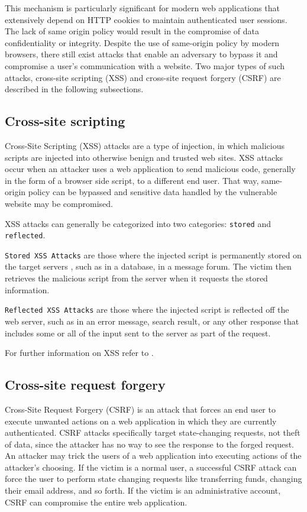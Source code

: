 This mechanism is particularly significant for modern web applications that extensively 
depend on HTTP cookies to maintain authenticated user sessions. The lack of same origin
policy would result in the compromise of data confidentiality or integrity. Despite the
use of same-origin policy by modern browsers, there still exist attacks that enable an
adversary to bypass it and compromise a user's communication with a website. Two major
types of such attacks, cross-site scripting (XSS) and cross-site request forgery (CSRF)
are described in the following subsections.

\subsection{Cross-site scripting}

Cross-Site Scripting (XSS) attacks are a type of injection, in which malicious scripts 
are injected into otherwise benign and trusted web sites. XSS attacks occur when an attacker 
uses a web application to send malicious code, generally in the form of a browser side
script, to a different end user. That way, same-origin policy can be bypassed and sensitive
data handled by the vulnerable website may be compromised.

XSS attacks can generally be categorized into two categories: \texttt{stored} and \texttt{reflected}.

\texttt{Stored XSS Attacks} are those where the injected script is permanently stored on
the target servers , such as in a database, in a message forum. The victim then retrieves
the malicious script from the server when it requests the stored information.

\texttt{Reflected XSS Attacks} are those where the injected script is reflected off the web
server, such as in an error message, search result, or any other response that includes some
or all of the input sent to the server as part of the request.

For further information on XSS refer to \cite{xssowasp}.

\subsection{Cross-site request forgery}

Cross-Site Request Forgery (CSRF) is an attack that forces an end user to execute unwanted
actions on a web application in which they are currently authenticated. CSRF attacks
specifically target state-changing requests, not theft of data, since the attacker has
no way to see the response to the forged request.
An attacker may trick the users of a web application into executing actions of the attacker's
choosing. If the victim is a normal user, a successful CSRF attack can force the user to perform
state changing requests like transferring funds, changing their email address, and so forth.
If the victim is an administrative account, CSRF can compromise the entire web application.

